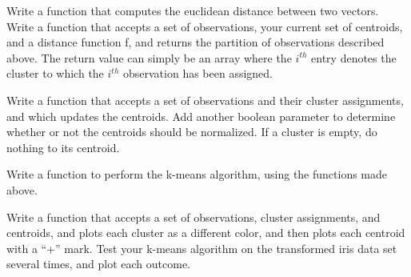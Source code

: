 \begin{problem}
Write a function that computes the euclidean distance between two vectors. Write a function that accepts a set of observations, your current set of centroids, and a distance function f, and returns the partition of observations described above. The return value can simply be an array where the $i^{th}$ entry denotes the cluster to which the $i^{th}$ observation has been assigned.
\end{problem}

\begin{problem}
Write a function that accepts a set of observations and their cluster assignments, and which updates the centroids. Add another boolean parameter to determine whether or not the centroids should be normalized. If a cluster is empty, do nothing to its centroid.
\end{problem}

\begin{problem}
Write a function to perform the k-means algorithm, using the functions made above.
\end{problem}

\begin{problem}
Write a function that accepts a set of observations, cluster assignments, and centroids, and plots each cluster as a different color, and then plots each centroid with a ``+'' mark. Test your k-means algorithm on the transformed iris data set several times, and plot each outcome.
\end{problem}
